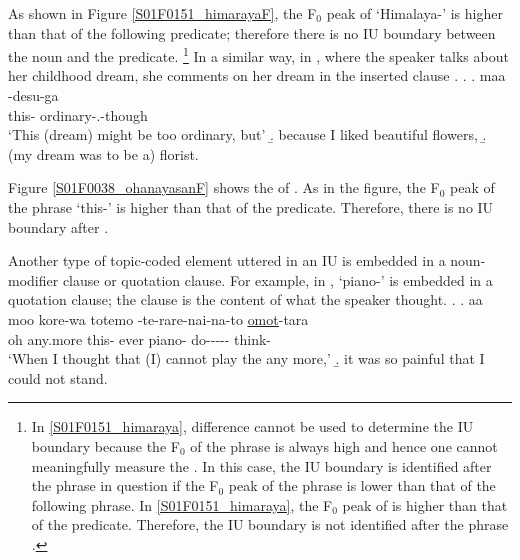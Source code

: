 As shown in Figure \ref{S01F0151_himarayaF},
the F$_{0}$ peak of  `Himalaya-' is higher than
that of the following predicate;
therefore there is no IU boundary between the noun and the predicate.%
	\footnote{
	In \ref{S01F0151_himaraya},  difference cannot be used
	to determine the IU boundary
	because the F$_{0}$ of the phrase  is always high
	and hence one cannot meaningfully measure the .
	In this case, the IU boundary is identified after the phrase in question
	if the F$_{0}$ peak of the phrase is lower than that of the following phrase.
	In \ref{S01F0151_himaraya}, the F$_{0}$ peak of  is higher than that of the predicate.
	Therefore, the IU boundary is not identified after the phrase 
	\cite[see][p.~420 ff.]{igarashietal06}.
	}
In a similar way,
in \Next, where the speaker talks about her childhood dream,
she comments on her dream in the inserted clause \Next[a].
%
\ex.\label{S01F0038_ohanayasan}
 \ag. maa  -desu-ga \tp{\dvline} \\
 		 this- ordinary-.-though {} \\
		`This (dream) might be too ordinary, but'
 \b. because I liked beautiful flowers,
 \b. (my dream was to be a) florist.

Figure \ref{S01F0038_ohanayasanF} shows the  of \Last[a].
As in the figure,
the F$_{0}$ peak of the  phrase  `this-' is higher than that of the predicate.
Therefore, there is no IU boundary after .

Another type of topic-coded element uttered in an  IU is
embedded in a noun-modifier clause or quotation clause.
For example, in \Next[a],
 `piano-' is embedded in a quotation clause;
the clause is the content of what the speaker thought.
%
\ex.\label{S00F0209_piano}
 \ag. aa moo \tp{\dvline} kore-wa totemo  -te-rare-nai-na-to \ul{\ul{omot}}-tara \tp{\dvline} \\
 	oh any.more {} this- ever piano- do----- think- {} \\
	`When I thought that (I) cannot play the  any more,'
 \b. it was so painful that I could not stand.

